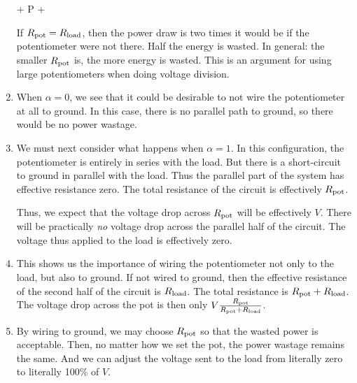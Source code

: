 \documentclass[11pt, oneside]{amsart}
\begin{document}
\begin{enumerate}
  \begin{nedqn}
  \eqcol
     + 
    P
  \eqcol
     + 
  \end{nedqn}

  If $R_\text{pot} = R_\text{load}$, then the power draw is two times it would be
  if the potentiometer were not there. Half the energy is wasted. In
  general: the smaller $R_\text{pot}$ is, the more energy is wasted. This is an
  argument for using large potentiometers when doing voltage division.

  \item When $\alpha = 0$, we see that it could be desirable to not wire
  the potentiometer at all to ground. In this case, there is no parallel
  path to ground, so there would be no power wastage.

  \item We must next consider what happens when $\alpha = 1$. In this
  configuration, the potentiometer is entirely in series with the load.
  But there is a short-circuit to ground in parallel with the load. Thus
  the parallel part of the system has effective resistance zero. The
  total resistance of the circuit is effectively $R_\text{pot}$.

  Thus, we expect that the voltage drop across $R_\text{pot}$ will be
  effectively $V$. There will be practically \emph{no} voltage drop
  across the parallel half of the circuit. The voltage thus applied to
  the load is effectively zero.

  \item This shows us the importance of wiring the potentiometer not
  only to the load, but also to ground. If not wired to ground, then the
  effective resistance of the second half of the circuit is $R_\text{load}$.
  The total resistance is $R_\text{pot} + R_\text{load}$. The voltage drop across the
  pot is then only $V \frac{R_\text{pot}}{R_\text{pot} + R_\text{load}}$.

  \item By wiring to ground, we may choose $R_\text{pot}$ so that the wasted
  power is acceptable. Then, no matter how we set the pot, the power
  wastage remains the same. And we can adjust the voltage sent to the
  load from literally zero to literally 100\% of $V$.
\end{enumerate}
\end{document}
